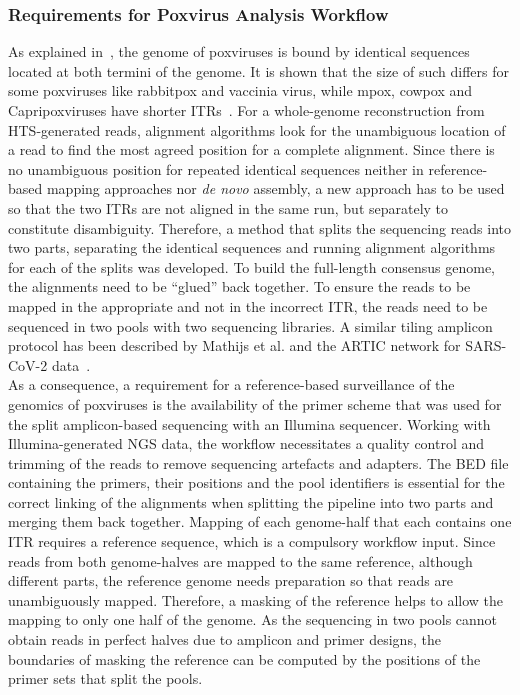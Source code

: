 \subsubsection{Requirements for Poxvirus Analysis Workflow}
As explained in~, the genome of poxviruses is bound by identical sequences located at both termini of the genome. It is shown that the size of such differs for some poxviruses like rabbitpox and vaccinia virus, while mpox, cowpox and Capripoxviruses have shorter \acp{ITR}~\cite{wittek1978inverted}. For a whole-genome reconstruction from \ac{HTS}-generated reads, alignment algorithms look for the unambiguous location of a read to find the most agreed position for a complete alignment. Since there is no unambiguous position for repeated identical sequences neither in reference-based mapping approaches nor \textit{de novo} assembly, a new approach has to be used so that the two \acp{ITR} are not aligned in the same run, but separately to constitute disambiguity. Therefore, a method that splits the sequencing reads into two parts, separating the identical sequences and running alignment algorithms for each of the splits was developed. To build the full-length consensus genome, the alignments need to be ``glued'' back together. To ensure the reads to be mapped in the appropriate and not in the incorrect \ac{ITR}, the reads need to be sequenced in two pools with two sequencing libraries. A similar tiling amplicon protocol has been described by Mathijs et al. and the ARTIC network for \ac{SARS-CoV-2} data~\cite{tyson2020improvements, mathijs2022robust}. \\
As a consequence, a requirement for a reference-based surveillance of the genomics of poxviruses is the availability of the primer scheme that was used for the split amplicon-based sequencing with an Illumina sequencer. Working with Illumina-generated \ac{NGS} data, the workflow necessitates a quality control and trimming of the reads to remove sequencing artefacts and adapters. The \ac{BED} file containing the primers, their positions and the pool identifiers is essential for the correct linking of the alignments when splitting the pipeline into two parts and merging them back together. Mapping of each genome-half that each contains one \ac{ITR} requires a reference sequence, which is a compulsory workflow input. Since reads from both genome-halves are mapped to the same reference, although different parts, the reference genome needs preparation so that reads are unambiguously mapped. Therefore, a masking of the reference helps to allow the mapping to only one half of the genome. As the sequencing in two pools cannot obtain reads in perfect halves due to amplicon and primer designs, the boundaries of masking the reference can be computed by the positions of the primer sets that split the pools. \\
